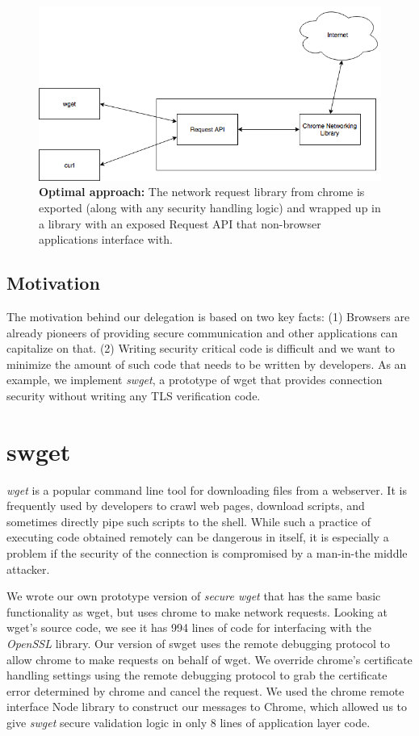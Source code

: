 \begin{figure}[h]
  \includegraphics[width=\textwidth]{figures/long-term} \caption[Optimal
  approach]{\textbf{Optimal approach:} The network request library from chrome
  is exported (along with any security handling logic) and wrapped up in a
  library with an exposed Request API that non-browser applications interface
  with.} \label{fig:long-term-saber}
\end{figure}

\subsection{Motivation}
The motivation behind our delegation is based on two key facts: (1) Browsers
are already pioneers of providing secure communication and other applications
can capitalize on that. (2) Writing security critical code is difficult and we
want to minimize the amount of such code that needs to be written by
developers. As an example, we implement \emph{swget}, a prototype of wget that
provides connection security without writing any TLS verification code.

\section{swget}
\label{sec:swget-saber}

\emph{wget} is a popular command line tool for downloading files from a
webserver. It is frequently used by developers to crawl web pages, download
scripts, and sometimes directly pipe such scripts to the shell. While such a
practice of executing code obtained remotely can be dangerous in itself, it
is especially a problem if the security of the connection is compromised by a
man-in-the middle attacker.

We wrote our own prototype version of \emph{secure wget} that has the same
basic functionality as wget, but uses chrome to make network requests. Looking
at wget's source code, we see it has 994 lines of code for interfacing with the
\emph{OpenSSL} library. Our version of swget uses the remote debugging protocol
to allow chrome to make requests on behalf of wget. We override chrome's
certificate handling settings using the remote debugging protocol to grab the
certificate error determined by chrome and cancel the request. We used the
chrome remote interface Node library to construct our messages to Chrome, which
allowed us to give \emph{swget} secure validation logic in only 8 lines of
application layer code.


